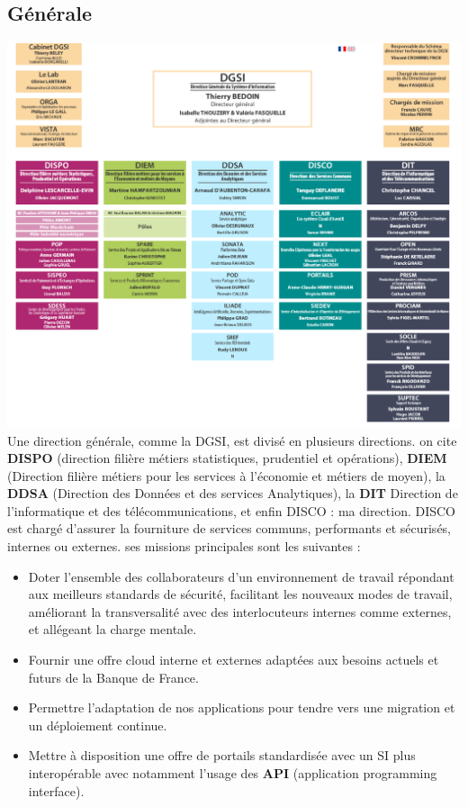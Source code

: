 \documentclass{report}
\begin{document}
\subsection{Générale}
\includegraphics[scale=0.55]{ORGA}
Une direction générale, comme la DGSI, est divisé en plusieurs directions. on cite \textbf{DISPO} (direction filière métiers statistiques, prudentiel et opérations), \textbf{DIEM} (Direction filière métiers pour les services à l'économie et métiers de moyen), la \textbf{DDSA} (Direction des Données et des services Analytiques), la \textbf{DIT} Direction de l'informatique et des télécommunications, et enfin DISCO : ma direction.
DISCO est chargé d'assurer la fourniture de services communs, performants et sécurisés, internes ou externes. ses missions principales sont les suivantes :\\
\begin{itemize}
    \item Doter l'ensemble des collaborateurs d'un environnement de travail répondant aux meilleurs standards de sécurité, facilitant les nouveaux modes de travail, améliorant la transversalité avec des interlocuteurs internes comme externes, et allégeant la charge mentale.
    \item Fournir une offre cloud interne et externes adaptées aux besoins actuels et futurs de la Banque de France.
    \item Permettre l'adaptation de nos applications pour tendre vers une migration et un déploiement continue.
    \item Mettre à disposition une offre de portails standardisée avec un SI plus interopérable avec notamment l'usage des \textbf{API} (application programming interface).
\end{itemize}
\end{document}

